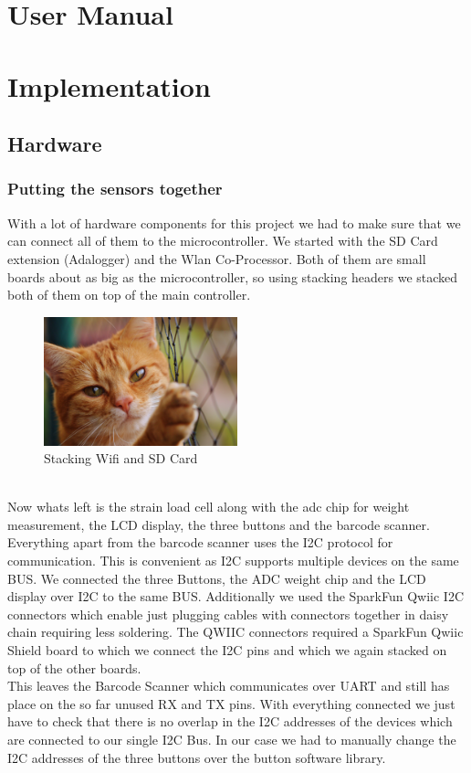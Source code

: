 \documentclass{article}
\begin{document}
\section{User Manual}
\lipsum[1]\lipsum[1]
\section{Implementation}
\subsection{Hardware}
\subsubsection{Putting the sensors together}
With a lot of hardware components for this project we had to make sure that we can connect all of them to the microcontroller.
We started with the SD Card extension (Adalogger) and the Wlan Co-Processor. Both of them are small boards about as big as the microcontroller, so using stacking headers we stacked both of them on top of the main controller.\\
\begin{figure}[h]
    \centering
    \includegraphics[width=0.5\textwidth]{cat.jpg}
    \caption{Stacking Wifi and SD Card}
    \label{fig:mesh1}
\end{figure}\\
Now whats left is the strain load cell along with the adc chip for weight measurement, the LCD display, the three buttons and the barcode scanner. 
Everything apart from the barcode scanner uses the I2C protocol for communication. This is convenient as I2C supports multiple devices on the same BUS.
We connected the three Buttons, the ADC weight chip and the LCD display over I2C to the same BUS. Additionally we used the SparkFun Qwiic I2C connectors which enable just plugging cables with
connectors together in daisy chain requiring less soldering. The QWIIC connectors required a SparkFun Qwiic Shield board to which we connect the I2C pins and which we again stacked on top of the other boards.\\
This leaves the Barcode Scanner which communicates over UART and still has place on the so far unused RX and TX pins.
With everything connected we just have to check that there is no overlap in the I2C addresses of the devices which are connected to our single I2C Bus.
In our case we had to manually change the I2C addresses of the three buttons over the button software library.
\end{document}
